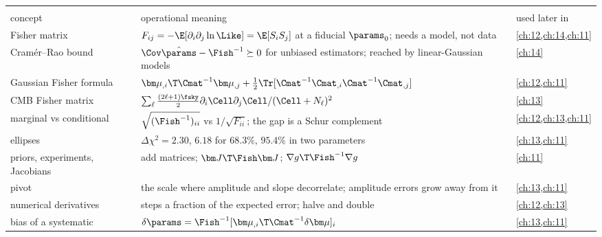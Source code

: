 \begin{center}
\small
\renewcommand{\arraystretch}{1.15}
\begin{tabularx}{\linewidth}{@{}>{\raggedright\arraybackslash}p{3.3cm}
                               >{\raggedright\arraybackslash}X
                               >{\raggedright\arraybackslash}p{2.3cm}@{}}
\toprule
\multicolumn{3}{@{}l}{\textbf{The Fisher matrix}}\\
concept & operational meaning & used later in\\\midrule
Fisher matrix & $F_{ij}=-\E[\partial_i\partial_j\ln\Like]=\E[S_iS_j]$ at a fiducial $\params_0$; needs a model, not data & \cref{ch:12,ch:14,ch:11}\\
Cram\'er--Rao bound & $\Cov\hat\params-\Fish^{-1}\succeq0$ for unbiased estimators; reached by linear-Gaussian models & \cref{ch:14}\\
Gaussian Fisher formula & $\bm\mu_{,i}\T\Cmat^{-1}\bm\mu_{,j}+\frac12\Tr[\Cmat^{-1}\Cmat_{,i}\Cmat^{-1}\Cmat_{,j}]$ & \cref{ch:12,ch:11}\\
CMB Fisher matrix & $\sum_\ell\frac{(2\ell+1)\fsky}{2}\partial_i\Cell\partial_j\Cell/(\Cell+N_\ell)^2$ & \cref{ch:13}\\
marginal vs conditional & $\sqrt{(\Fish^{-1})_{ii}}$ vs $1/\sqrt{F_{ii}}$; the gap is a Schur complement & \cref{ch:12,ch:13,ch:11}\\
ellipses & $\Delta\chi^2=2.30$, $6.18$ for $68.3\%$, $95.4\%$ in two parameters & \cref{ch:13,ch:11}\\
priors, experiments, Jacobians & add matrices; $\bm J\T\Fish\bm J$; $\nabla g\T\Fish^{-1}\nabla g$ & \cref{ch:11}\\
pivot & the scale where amplitude and slope decorrelate; amplitude errors grow away from it & \cref{ch:13,ch:11}\\
numerical derivatives & steps a fraction of the expected error; halve and double & \cref{ch:12,ch:13}\\
bias of a systematic & $\delta\params=\Fish^{-1}[\bm\mu_{,i}\T\Cmat^{-1}\delta\bm\mu]_i$ & \cref{ch:13,ch:11}\\
\bottomrule
\end{tabularx}
\end{center}

